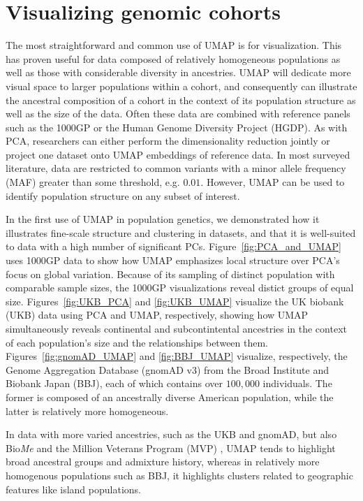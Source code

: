 \documentclass[12pt]{article}
\begin{document}
\section*{Visualizing genomic cohorts}
The most straightforward and common use of UMAP is for visualization. This has proven useful for data composed of relatively homogeneous populations as well as those with considerable diversity in ancestries. UMAP will dedicate more visual space to larger populations within a cohort, and consequently can illustrate the ancestral composition of a cohort in the context of its population structure as well as the size of the data. Often these data are combined with reference panels such as the 1000GP or the Human Genome Diversity Project (HGDP)\cite{cann2002human}.  As with PCA, researchers can either perform the dimensionality reduction jointly or project one dataset onto UMAP embeddings of reference data. In most surveyed literature, data are restricted to common variants with a minor allele frequency (MAF) greater than some threshold, e.g. $0.01$. However, UMAP can be used to identify population structure on any subset of interest.

In the first use of UMAP in population genetics, we demonstrated how it illustrates fine-scale structure and clustering in datasets, and that it is well-suited to data with a high number of significant PCs\cite{diaz-papkovich_umap_2019}.  Figure~\ref{fig:PCA_and_UMAP} uses 1000GP data to show how UMAP emphasizes local structure over PCA's focus on global variation. Because of its sampling of distinct population with comparable sample sizes, the 1000GP visualizations reveal distict groups of equal size. Figures~\ref{fig:UKB_PCA} and \ref{fig:UKB_UMAP} visualize the UK biobank (UKB)\cite{sudlow2015uk} data using PCA and UMAP, respectively, showing how UMAP simultaneously reveals continental and subcontintental ancestries in the context of each population's size and the relationships between them. Figures~\ref{fig:gnomAD_UMAP} and \ref{fig:BBJ_UMAP} visualize, respectively, the Genome Aggregation Database (gnomAD v3) from the Broad Institute\cite{karczewski_mutational_2020} and Biobank Japan (BBJ)\cite{nagai2017overview}\cite{sakaue_dimensionality_2020}, each of which contains over $100,000$ individuals. The former is composed of an ancestrally diverse American population, while the latter is relatively more homogeneous.

In data with more varied ancestries, such as the UKB and gnomAD, but also Bio\textit{Me}\cite{belbin_towards_2019} and the Million Veterans Program (MVP) \cite{hunter-zinck_genotyping_2020}, UMAP tends to highlight broad ancestral groups and admixture history, whereas in relatively more homogenous populations such as BBJ, it highlights clusters related to geographic features like island populations. 
\end{document}
